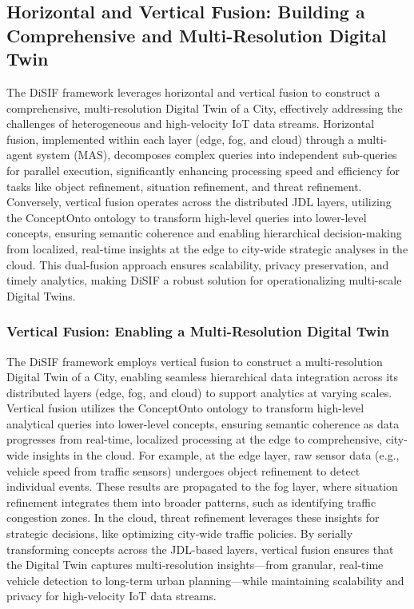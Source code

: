 \documentclass[5p,times]{elsarticle}
\begin{document}
\subsection{Horizontal and Vertical Fusion: Building a Comprehensive and Multi-Resolution Digital Twin}

The DiSIF framework leverages horizontal and vertical fusion to construct a comprehensive,
 multi-resolution Digital Twin of a City, effectively addressing the challenges 
 of heterogeneous and high-velocity IoT data streams. Horizontal fusion, implemented
  within each layer (edge, fog, and cloud) through a multi-agent system (MAS),
   decomposes complex queries into independent sub-queries for parallel execution,
    significantly enhancing processing speed and efficiency for tasks like object
     refinement, situation refinement, and threat refinement. Conversely, vertical
      fusion operates across the distributed JDL layers, utilizing the ConceptOnto
       ontology to transform high-level queries into lower-level concepts, ensuring
        semantic coherence and enabling hierarchical decision-making from localized,
         real-time insights at the edge to city-wide strategic analyses in the cloud. 
         This dual-fusion approach ensures scalability, privacy preservation,
          and timely analytics, making DiSIF a robust solution for operationalizing multi-scale Digital Twins.

\subsubsection{ Vertical Fusion: Enabling a Multi-Resolution Digital Twin}
The DiSIF framework employs vertical fusion to construct a multi-resolution Digital Twin of a City,
 enabling seamless hierarchical data integration across its distributed layers
  (edge, fog, and cloud) to support analytics at varying scales. Vertical fusion
   utilizes the ConceptOnto ontology to transform high-level analytical
    queries into lower-level concepts, ensuring semantic coherence as data
     progresses from real-time, localized processing at the edge to comprehensive,
      city-wide insights in the cloud. For example, at the edge layer, 
      raw sensor data (e.g., vehicle speed from traffic sensors) undergoes object
       refinement to detect individual events. These results are propagated 
       to the fog layer, where situation refinement integrates them into broader
        patterns, such as identifying traffic congestion zones. In the cloud,
         threat refinement leverages these insights for strategic decisions,
          like optimizing city-wide traffic policies. By serially transforming
           concepts across the JDL-based layers, vertical fusion ensures
            that the Digital Twin captures multi-resolution insights—from granular,
             real-time vehicle detection to long-term urban planning—while
              maintaining scalability and privacy for high-velocity IoT data streams.
\end{document}

